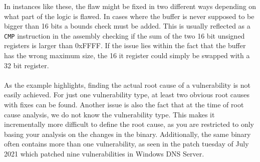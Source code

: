 \documentclass{report}
\begin{document}
In instances like these, the flaw might be fixed in two different ways depending on what part of the logic is flawed. In cases where the buffer is never supposed to be bigger than 16 bits a bounds check must be added. This is usually reflected as a \texttt{CMP} instruction in the assembly checking if the sum of the two 16 bit unsigned registers is larger than 0xFFFF. If the issue lies within the fact that the buffer has the wrong maximum size, the 16 it register could simply be swapped with a 32 bit register.
\\
\\
As the example highlights, finding the actual root cause of a vulnerability is not easily achieved. For just one vulnerability type, at least two obvious root causes with fixes can be found. Another issue is also the fact that at the time of root cause analysis, we do not know the vulnerability type. This makes it incrementally more difficult to define the root cause, as you are restricted to only basing your analysis on the changes in the binary. Additionally, the same binary often contains more than one vulnerability, as seen in the patch tuesday of July 2021\cite{url:patch-tuesday:2021:july} which patched nine vulnerabilities in Windows DNS Server.

\end{document}
